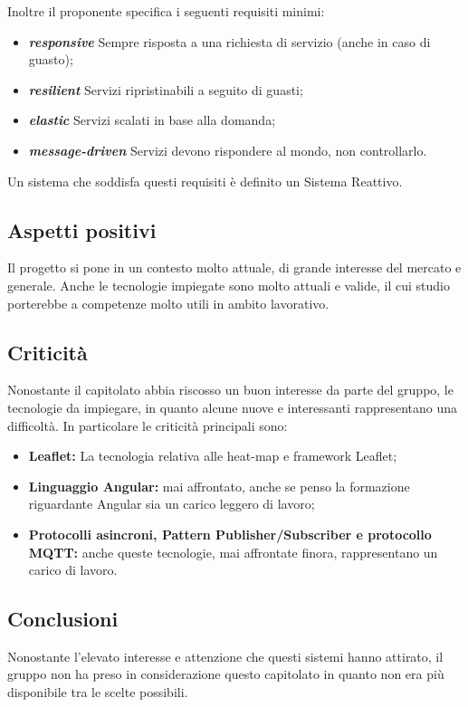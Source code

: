 Inoltre il proponente specifica i seguenti requisiti minimi:
\begin{itemize}
	\item \textbf{\textit{responsive}} Sempre risposta a una richiesta di servizio (anche in caso di guasto);
	\item \textbf{\textit{resilient}} Servizi ripristinabili a seguito di guasti;
	\item \textbf{\textit{elastic}} Servizi scalati in base alla domanda;
	\item \textbf{\textit{message-driven}} Servizi devono rispondere al mondo, non controllarlo.
\end{itemize}
Un sistema che soddisfa questi requisiti è definito un Sistema Reattivo.
	
	
\subsection{Aspetti positivi}

Il progetto si pone in un contesto molto attuale, di grande interesse del mercato e generale.
Anche le tecnologie impiegate sono molto attuali e valide, il cui studio porterebbe a competenze molto utili in ambito lavorativo.



\subsection{Criticità}

Nonostante il capitolato abbia riscosso un buon interesse da parte del gruppo, le tecnologie da impiegare, in quanto alcune nuove e interessanti rappresentano una difficoltà.
In particolare le criticità principali sono:
\begin{itemize}
    \item \textbf{Leaflet:} La tecnologia relativa alle heat-map e framework Leaflet;
    \item \textbf{Linguaggio Angular:} mai affrontato, anche se penso la formazione riguardante Angular sia un carico leggero di lavoro;
    \item \textbf{Protocolli asincroni, Pattern Publisher/Subscriber e protocollo MQTT: } anche queste tecnologie, mai affrontate finora, rappresentano un carico di lavoro.
\end{itemize}


\subsection{Conclusioni}

Nonostante l'elevato interesse e attenzione che questi sistemi hanno attirato, il gruppo non ha preso in considerazione questo capitolato in quanto non era più disponibile tra le scelte possibili.

